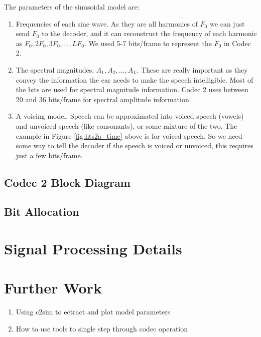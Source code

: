 \documentclass{article}
\begin{document}
The parameters of the sinusoidal model are:
\begin{enumerate}
\item Frequencies of each sine wave.  As they are all harmonics of $F_0$ we can just send $F_0$ to the decoder, and it can reconstruct the frequency of each harmonic as $F_0,2F_0,3F_0,...,LF_0$.  We used 5-7 bits/frame to represent the $F_0$ in Codec 2.
\item The spectral magnitudes, $A_1,A_2,...,A_L$.  These are really important as they convey the information the ear needs to make the speech intelligible.  Most of the bits are used for spectral magnitude information.  Codec 2 uses between 20 and 36 bits/frame for spectral amplitude information.
\item A voicing model.  Speech can be approximated into voiced speech (vowels) and unvoiced speech (like consonants), or some mixture of the two.  The example in Figure \ref{fig:hts2a_time} above is for voiced speech.  So we need some way to tell the decoder if the speech is voiced or unvoiced, this requires just a few bits/frame.
\end{enumerate}

\subsection{Codec 2 Block Diagram}


\subsection{Bit Allocation}

\section{Signal Processing Details}
\label{sect:details}

\cite{griffin1988multiband}

\section{Further Work}

\begin{enumerate}
\item Using c2sim to ectract and plot model parameters
\item How to use tools to single step through codec operation
\end{enumerate}




\end{document}

